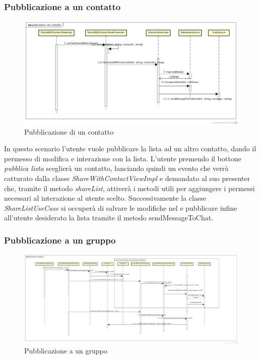 \subsubsection{Pubblicazione a un contatto}

\label{Pubblicazione di un contatto}
\begin{figure}[H]
	\centering
	\includegraphics[width=\textwidth]{Sezioni/Diagrammi/App/publicazione_con_contatto.jpg}
	\caption{Pubblicazione di un contatto}
	
\end{figure}
In questo scenario l'utente vuole pubblicare la lista ad un altro contatto, dando il permesso di modifica e interazione con la lista. L'utente premendo il bottone \textit{pubblica lista} sceglierà un contatto, lanciando quindi un evento che verrà catturato dalla classe \textit{ShareWithContactViewImpl} e demandato al suo presenter che, tramite il metodo \textit{shareList}, attiverà i metodi utili per aggiungere i permessi necessari al interazione al utente scelto. Successivamente la classe \textit{ShareListUseCase} si occuperà di salvare le modifiche nel  e pubblicare infine all'utente desiderato la lista tramite il metodo {sendMessageToChat}.


\subsubsection{Pubblicazione a un gruppo}

\label{Pubblicazione a un gruppo}
\begin{figure}[H]
	\centering
	\includegraphics[width=\textwidth]{Sezioni/Diagrammi/App/publicazionecongruppo.png}
	\caption{Pubblicazione a un gruppo}
	
\end{figure}

